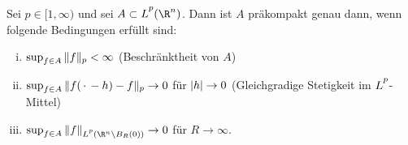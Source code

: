 \thmmanualindex
\begin{thSatz}
    \label{vl27:kompaktLp}
    Sei $p\in[1,\infty)$ und sei $A\subset\Lpp(\R^n)$. Dann ist $A$ präkompakt
    genau dann, wenn folgende Bedingungen erfüllt sind:
    \begin{enumerate}[(i)]
        \item \label{vl27:kompaktLp:i}
            $\sup_{f\in A} \, \lVert f\rVert_p < \infty$\hfill
            (Beschränktheit von $A$)
        \item \label{vl27:kompaktLp:ii}
            $\sup_{f\in A} \, \lVert f(\,\cdot\,-h)-f\rVert_p \to 0$ für
            $\lvert h\rvert\to0$\hfill
            (Gleichgradige Stetigkeit im $\Lpp$-Mittel)
        \item \label{vl27:kompaktLp:iii}
            $\sup_{f\in A} \, \norm{f}_{\Lpp(\R^n\setminus B_R(0))} \to 0$
            für $R\to\infty$.
    \end{enumerate}
\end{thSatz}

